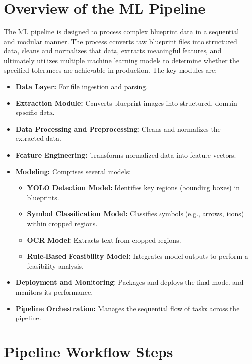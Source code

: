 \documentclass{article}
\begin{document}
\section{Overview of the ML Pipeline}
The ML pipeline is designed to process complex blueprint data in a sequential and modular manner. The process converts raw blueprint files into structured data, cleans and normalizes that data, extracts meaningful features, and ultimately utilizes multiple machine learning models to determine whether the specified tolerances are achievable in production. The key modules are:
\begin{itemize}[label={--}]
    \item \textbf{Data Layer:} For file ingestion and parsing.
    \item \textbf{Extraction Module:} Converts blueprint images into structured, domain-specific data.
    \item \textbf{Data Processing and Preprocessing:} Cleans and normalizes the extracted data.
    \item \textbf{Feature Engineering:} Transforms normalized data into feature vectors.
    \item \textbf{Modeling:} Comprises several models:
    \begin{itemize}[label={-}]
        \item \textbf{YOLO Detection Model:} Identifies key regions (bounding boxes) in blueprints.
        \item \textbf{Symbol Classification Model:} Classifies symbols (e.g., arrows, icons) within cropped regions.
        \item \textbf{OCR Model:} Extracts text from cropped regions.
        \item \textbf{Rule-Based Feasibility Model:} Integrates model outputs to perform a feasibility analysis.
    \end{itemize}
    \item \textbf{Deployment and Monitoring:} Packages and deploys the final model and monitors its performance.
    \item \textbf{Pipeline Orchestration:} Manages the sequential flow of tasks across the pipeline.
\end{itemize}

\section{Pipeline Workflow Steps}
\end{document}
